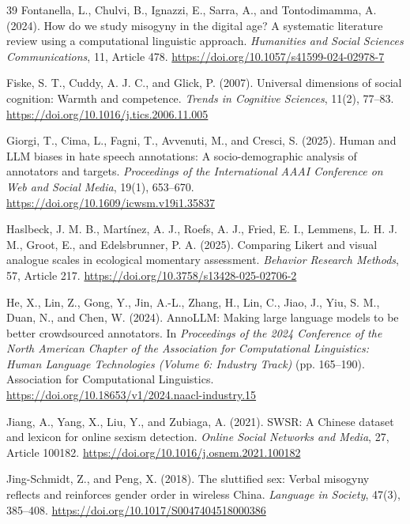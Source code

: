 \documentclass[a4paper,fleqn,review,longmktitle]{cas-sc}
\begin{document}
\begin{thebibliography}{39}
Fontanella, L., Chulvi, B., Ignazzi, E., Sarra, A., and Tontodimamma, A. (2024).
How do we study misogyny in the digital age? A systematic literature review using a computational linguistic approach.
\emph{Humanities and Social Sciences Communications}, 11, Article 478.
\url{https://doi.org/10.1057/s41599-024-02978-7}

Fiske, S. T., Cuddy, A. J. C., and Glick, P. (2007).
Universal dimensions of social cognition: Warmth and competence.
\emph{Trends in Cognitive Sciences}, 11(2), 77--83.
\url{https://doi.org/10.1016/j.tics.2006.11.005}

Giorgi, T., Cima, L., Fagni, T., Avvenuti, M., and Cresci, S. (2025).
Human and LLM biases in hate speech annotations: A socio-demographic analysis of annotators and targets.
\emph{Proceedings of the International AAAI Conference on Web and Social Media}, 19(1), 653--670.
\url{https://doi.org/10.1609/icwsm.v19i1.35837}

Haslbeck, J. M. B., Mart\'inez, A. J., Roefs, A. J., Fried, E. I., Lemmens, L. H. J. M., Groot, E., and Edelsbrunner, P. A. (2025).
Comparing Likert and visual analogue scales in ecological momentary assessment.
\emph{Behavior Research Methods}, 57, Article 217.
\url{https://doi.org/10.3758/s13428-025-02706-2}

He, X., Lin, Z., Gong, Y., Jin, A.-L., Zhang, H., Lin, C., Jiao, J., Yiu, S. M., Duan, N., and Chen, W. (2024).
AnnoLLM: Making large language models to be better crowdsourced annotators.
In \emph{Proceedings of the 2024 Conference of the North American Chapter of the Association for Computational Linguistics: Human Language Technologies (Volume 6: Industry Track)} (pp. 165--190).
Association for Computational Linguistics.
\url{https://doi.org/10.18653/v1/2024.naacl-industry.15}

Jiang, A., Yang, X., Liu, Y., and Zubiaga, A. (2021).
SWSR: A Chinese dataset and lexicon for online sexism detection.
\emph{Online Social Networks and Media}, 27, Article 100182.
\url{https://doi.org/10.1016/j.osnem.2021.100182}

Jing-Schmidt, Z., and Peng, X. (2018).
The sluttified sex: Verbal misogyny reflects and reinforces gender order in wireless China.
\emph{Language in Society}, 47(3), 385--408.
\url{https://doi.org/10.1017/S0047404518000386}


\end{thebibliography}
\end{document}
